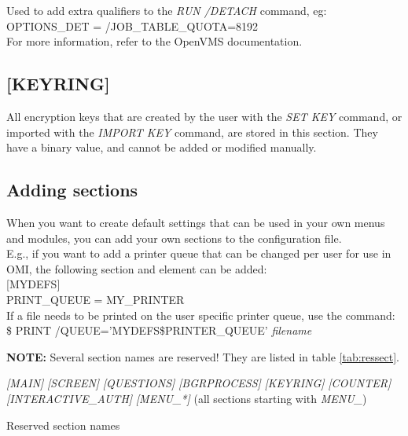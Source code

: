 \documentclass[a4paper]{book}
\newcommand{\vs}{\vspace{3mm}}
\renewcommand{\indent}{\hspace*{5mm}}
\begin{document}
Used to add extra qualifiers to the \textsl{RUN /DETACH} command, eg:\\
\indent\textsf{OPTIONS{\_}DET = /JOB{\_}TABLE{\_}QUOTA=8192} \\
For more information, refer to the OpenVMS documentation.

\subsection{[KEYRING]}
\label{subsubsec:mylabel20}

All encryption keys that are created by the user with the \textsl{SET KEY} command, 
or imported with the \textsl{IMPORT KEY} command, are stored in this section. They 
have a binary value, and cannot be added or modified manually.

\subsection{Adding sections}
\label{subsubsec:adding}

When you want to create default settings that can be used in your own menus 
and modules, you can add your own sections to the configuration file. \\
E.g., if you want to add a printer queue that can be changed per user for 
use in OMI, the following section and element can be added: \\
\indent\textsf{[MYDEFS]} \\
\indent\indent\textsf{PRINT{\_}QUEUE = MY{\_}PRINTER} \\
If a file needs to be printed on the user specific printer queue, use the command: \\
\indent\textsf{{\$} PRINT /QUEUE='MYDEFS{\$}PRINTER{\_}QUEUE' \textit{filename}}

\vs

\hspace{-8mm}\textbf{NOTE:} Several section names are reserved! They are listed in table 
\ref{tab:ressect}.

\begin{table}[h!tb]
\begin{minipage}[h!tb]{\textwidth}
\noindent\textsl{[MAIN]} \newline
\textsl{[SCREEN]} \newline
\textsl{[QUESTIONS]} \newline
\textsl{[BGRPROCESS]} \newline
\textsl{[KEYRING]} \newline
\textsl{[COUNTER]} \newline
\textsl{[INTERACTIVE{\_}AUTH]} \newline
\textsl{[MENU{\_}\textit{*}]} (all sections starting with \textsl{MENU{\_}}) \newline
\caption{Reserved section names}\label{tab:ressect}
\end{minipage}
\end{table}
\end{document}
